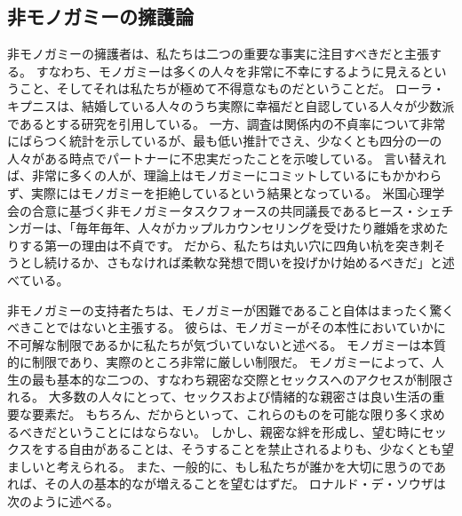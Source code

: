 \documentclass[paper=a4,book,openany]{jlreq}
\begin{document}
\subsection{非モノガミーの擁護論}

非モノガミーの擁護者は、私たちは二つの重要な事実に注目すべきだと主張する。
すなわち、モノガミーは多くの人々を非常に不幸にするように見えるということ、そしてそれは私たちが極めて不得意なものだということだ。
ローラ・キプニスは、結婚している人々のうち実際に幸福だと自認している人々が少数派であるとする研究を引用している\citep{kipnis03:_again_love}。
一方、調査は関係内の不貞率について非常にばらつく統計を示しているが、最も低い推計でさえ、少なくとも四分の一の人々がある時点でパートナーに不忠実だったことを示唆している\citep{blow05:_infid_commit_relat_ii,whisman07:_sexual_infid_nation_survey_americ_women}。
言い替えれば、非常に多くの人が、理論上はモノガミーにコミットしているにもかかわらず、実際にはモノガミーを拒絶しているという結果となっている。
米国心理学会の合意に基づく非モノガミータスクフォースの共同議長であるヒース・シェチンガーは、「毎年毎年、人々がカップルカウンセリングを受けたり離婚を求めたりする第一の理由は不貞です。
だから、私たちは丸い穴に四角い杭を突き刺そうとし続けるか、さもなければ柔軟な発想で問いを投げかけ始めるべきだ」と述べている\citep{hunt20:_psych_threes}。

非モノガミーの支持者たちは、モノガミーが困難であること自体はまったく驚くべきことではないと主張する。
彼らは、モノガミーがその本性においていかに不可解な制限であるかに私たちが気づいていないと述べる。
モノガミーは本質的に制限であり、実際のところ非常に厳しい制限だ。
モノガミーによって、人生の最も基本的な二つの、すなわち親密な交際とセックスへのアクセスが制限される。
大多数の人々にとって、セックスおよび情緒的な親密さは良い生活の重要な要素だ。
もちろん、だからといって、これらのものを可能な限り多く求めるべきだということにはならない。
しかし、親密な絆を形成し、望む時にセックスをする自由があることは、そうすることを禁止されるよりも、少なくとも望ましいと考えられる。
また、一般的に、もし私たちが誰かを大切に思うのであれば、その人の基本的なが増えることを望むはずだ。
ロナルド・デ・ソウザは次のように述べる。
\end{document}
